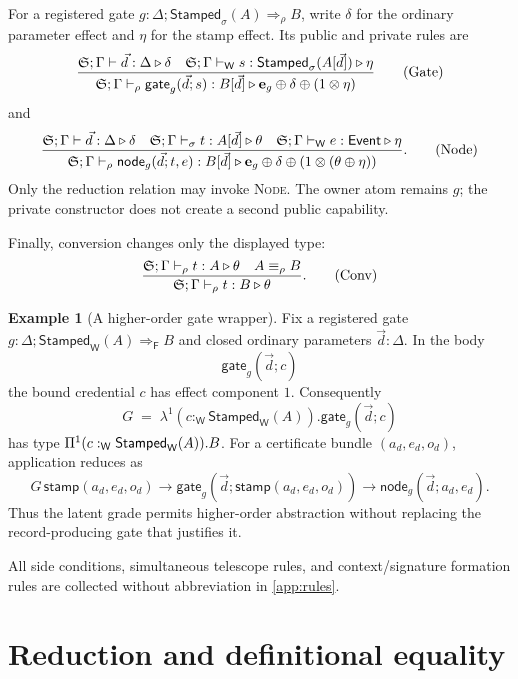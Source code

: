 \documentclass[11pt]{article}
\numberwithin{equation}{section}
\theoremstyle{definition}
\newtheorem{example}[definition]{Example}
\theoremstyle{plain}
\theoremstyle{remark}
\newcommand{\Event}{\mathsf{Event}}
\newcommand{\Stamped}{\mathsf{Stamped}}
\newcommand{\Frm}{\mathsf F}
\newcommand{\Wit}{\mathsf W}
\newcommand{\unit}{\mathbf e}
\newcommand{\jdeq}{\equiv}
\begin{document}
For a registered gate \(g:\Delta;\Stamped_\sigma(A)\Rightarrow_{\rho} B\),
write \(\delta\) for the ordinary parameter effect and \(\eta\) for the
stamp effect.  Its public and private rules are
\[
\frac{
 \AFDeclSignature;\Gamma\vdash\vec d:\Delta\triangleright\delta
 \quad
 \AFDeclSignature;\Gamma\vdash_{\Wit} s:\Stamped_\sigma(A[\vec d])
 \triangleright\eta
}{
 \AFDeclSignature;\Gamma\vdash_{\rho}\mathsf{gate}_g(\vec d;s):B[\vec d]
 \triangleright\unit_g\oplus\delta\oplus(1\otimes\eta)
}
\tag{Gate}
\]
and
\[
\frac{
 \AFDeclSignature;\Gamma\vdash\vec d:\Delta\triangleright\delta
 \quad
 \AFDeclSignature;\Gamma\vdash_{\sigma} t:A[\vec d]\triangleright\theta
 \quad
 \AFDeclSignature;\Gamma\vdash_{\Wit} e:\Event\triangleright\eta
}{
 \AFDeclSignature;\Gamma\vdash_{\rho}\mathsf{node}_g(\vec d;t,e):B[\vec d]
 \triangleright\unit_g\oplus\delta\oplus
  (1\otimes(\theta\oplus\eta))
}.
\tag{Node}
\]
Only the reduction relation may invoke \textsc{Node}.  The owner atom remains
\(g\); the private constructor does not create a second public capability.

Finally, conversion changes only the displayed type:
\[
\frac{
 \AFDeclSignature;\Gamma\vdash_{\rho} t:A\triangleright\theta
 \quad A\jdeq_{\rho} B
}{
 \AFDeclSignature;\Gamma\vdash_{\rho} t:B\triangleright\theta}.
\tag{Conv}
\]

\begin{example}[A higher-order gate wrapper]\label{ex:wrapper}
Fix a registered gate
\(
  g:\Delta;\Stamped_\Wit(A)\Rightarrow_{\Frm} B
\)
and closed ordinary parameters \(\vec d:\Delta\).  In the body
\[
  \mathsf{gate}_g(\vec d;c)
\]
the bound credential \(c\) has effect component \(1\).  Consequently
\[
  G\;=\;\lambda^1(c:_{\Wit}\Stamped_\Wit(A)).
       \mathsf{gate}_g(\vec d;c)
\]
has type
\(
  \AFDepFun^1(c:_{\Wit}\Stamped_\Wit(A)).B
\).
For a certificate bundle \((a_d,e_d,o_d)\), application reduces as
\[
 G\,\mathsf{stamp}(a_d,e_d,o_d)
 \longrightarrow
 \mathsf{gate}_g(\vec d;\mathsf{stamp}(a_d,e_d,o_d))
 \longrightarrow
 \mathsf{node}_g(\vec d;a_d,e_d).
\]
Thus the latent grade permits higher-order abstraction without replacing the
record-producing gate that justifies it.
\end{example}

All side conditions, simultaneous telescope rules, and context/signature
formation rules are collected without abbreviation in
\cref{app:rules}.

\section{Reduction and definitional equality}\label{sec:reduction}
\end{document}
